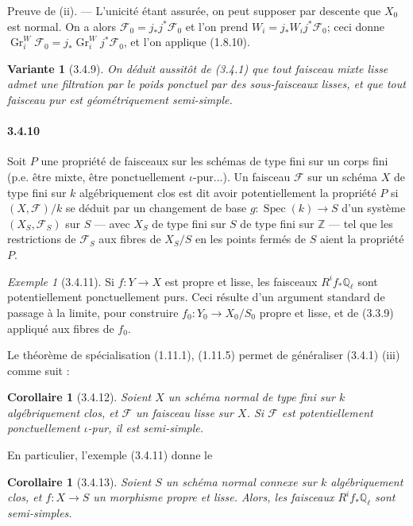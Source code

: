 \documentclass[12pt,a4paper]{article}
\theoremstyle{plain}
\newtheorem{corollary}[theorem]{Corollaire}
\newtheorem{variante}[theorem]{Variante}
\theoremstyle{definition}
\theoremstyle{remark}
\newtheorem{example}[theorem]{Exemple}
\DeclareMathOperator{\Gr}{Gr}
\DeclareMathOperator{\Spec}{Spec}
\newcommand{\QQ}{{\mathbb{Q}}}
\newcommand{\ZZ}{{\mathbb{Z}}}
\begin{document}
Preuve de (ii). --- L'unicit\'e \'etant assur\'ee, on peut supposer par descente que $X_0$ est normal. On a alors $\mathscr{F}_0 = j_* j^* \mathscr{F}_0$ et l'on prend $W_i = j_* W_i j^* \mathscr{F}_0$; ceci donne $\Gr_i^W \mathscr{F}_0 = j_* \Gr_i^W j^* \mathscr{F}_0$, et l'on applique (1.8.10).

\begin{variante}[3.4.9]
On d\'eduit aussit\^ot de (3.4.1) que tout faisceau mixte lisse admet une filtration par le poids ponctuel par des sous-faisceaux lisses, et que tout faisceau pur est g\'eom\'etriquement semi-simple.
\end{variante}

\paragraph{3.4.10}
Soit $P$ une propri\'et\'e de faisceaux sur les sch\'emas de type fini sur un corps fini (p.e. \^etre mixte, \^etre ponctuellement $\iota$-pur...). Un faisceau $\mathscr{F}$ sur un sch\'ema $X$ de type fini sur $k$ alg\'ebriquement clos est dit avoir potentiellement la propri\'et\'e $P$ si $(X, \mathscr{F})/k$ se d\'eduit par un changement de base $g : \Spec(k) \to S$ d'un syst\`eme $(X_S, \mathscr{F}_S)$ sur $S$ --- avec $X_S$ de type fini sur $S$ de type fini sur $\ZZ$ --- tel que les restrictions de $\mathscr{F}_S$ aux fibres de $X_S/S$ en les points ferm\'es de $S$ aient la propri\'et\'e $P$.


\begin{example}[3.4.11]
Si $f : Y \to X$ est propre et lisse, les faisceaux $R^i f_* \QQ_\ell$ sont potentiellement ponctuellement purs. Ceci r\'esulte d'un argument standard de passage \`a la limite, pour construire $f_0 : Y_0 \to X_0 / S_0$ propre et lisse, et de (3.3.9) appliqu\'e aux fibres de $f_0$.
\end{example}

Le th\'eor\`eme de sp\'ecialisation (1.11.1), (1.11.5) permet de g\'en\'eraliser (3.4.1) (iii) comme suit :

\begin{corollary}[3.4.12]
Soient $X$ un sch\'ema normal de type fini sur $k$ alg\'ebriquement clos, et $\mathscr{F}$ un faisceau lisse sur $X$. Si $\mathscr{F}$ est potentiellement ponctuellement $\iota$-pur, il est semi-simple.
\end{corollary}

En particulier, l'exemple (3.4.11) donne le

\begin{corollary}[3.4.13]
Soient $S$ un sch\'ema normal connexe sur $k$ alg\'ebriquement clos, et $f : X \to S$ un morphisme propre et lisse. Alors, les faisceaux $R^i f_* \QQ_\ell$ sont semi-simples.
\end{corollary}
\end{document}
